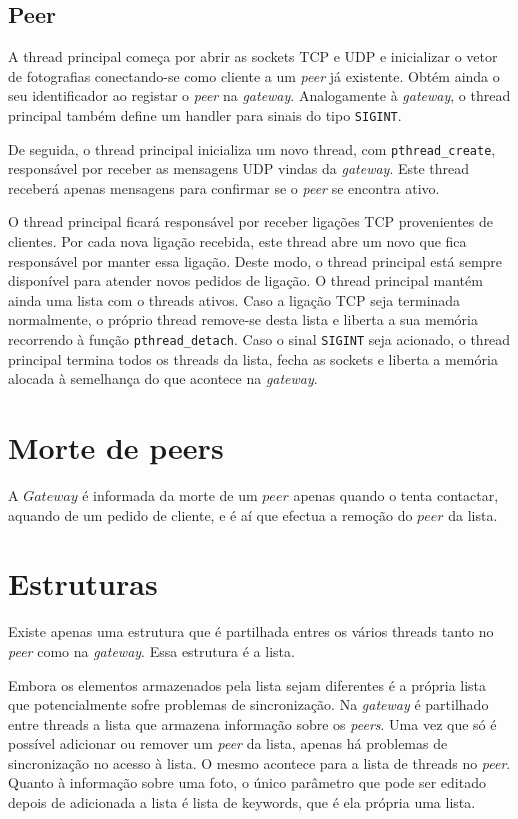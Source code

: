 \documentclass[a4paper, 12pt]{article}
\newcommand{\gateway}{\textit{gateway}\xspace}
\newcommand{\peer}{\textit{peer}\xspace}
\newcommand{\peers}{\textit{peers}\xspace}
\begin{document}
\subsection{Peer}

A thread principal começa por abrir as sockets TCP e UDP e inicializar o vetor de fotografias conectando-se como cliente a um \peer já existente. Obtém ainda o seu identificador ao registar o \peer na \gateway. Analogamente à \gateway, o thread principal também define um handler para sinais do tipo \texttt{SIGINT}.

De seguida, o thread principal inicializa um novo thread, com \texttt{pthread_create}, responsável por receber as mensagens UDP vindas da \gateway. Este thread receberá apenas mensagens para confirmar se o \peer se encontra ativo.

O thread principal ficará responsável por receber ligações TCP provenientes de clientes. Por cada nova ligação recebida, este thread abre um novo que fica responsável por manter essa ligação. Deste modo, o thread principal está sempre disponível para atender novos pedidos de ligação. O thread principal mantém ainda uma lista com o threads ativos. Caso a ligação TCP seja terminada normalmente, o próprio thread remove-se desta lista e liberta a sua memória recorrendo à função \texttt{pthread_detach}. Caso o sinal \texttt{SIGINT} seja acionado, o thread principal termina todos os threads da lista, fecha as sockets e liberta a memória alocada à semelhança do que acontece na \gateway.


\section{Morte de peers}
\par A $Gateway$ é informada da morte de um $peer$ apenas quando o tenta contactar, aquando de um pedido de cliente, e é aí que efectua a remoção do $peer$ da lista.



\section{Estruturas}

Existe apenas uma estrutura que é partilhada entres os vários threads tanto no \peer como na \gateway. Essa estrutura é a lista.

Embora os elementos armazenados pela lista sejam diferentes é a própria lista que potencialmente sofre problemas de sincronização. Na \gateway é partilhado entre threads a lista que armazena informação sobre os \peers. Uma vez que só é possível adicionar ou remover um \peer da lista, apenas há problemas de sincronização no acesso à lista. O mesmo acontece para a lista de threads no \peer. Quanto à informação sobre uma foto, o único parâmetro que pode ser editado depois de adicionada a lista é lista de keywords, que é ela própria uma lista.
\end{document}
